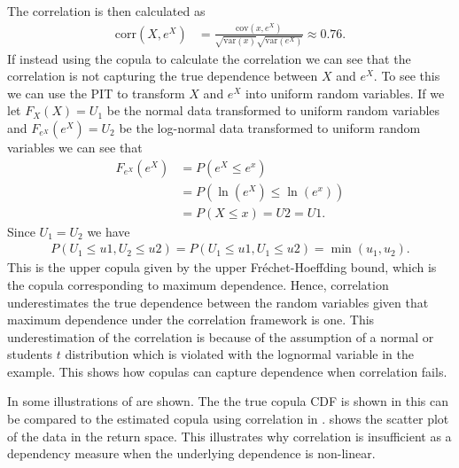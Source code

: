 \begin{example}
    The correlation is then calculated as
    \begin{align*}
        \mathrm{corr}(X,e^X) &= \frac{\mathrm{cov}(x,e^X)}{\sqrt{\mathrm{var}(x)} \sqrt{\mathrm{var}(e^X)}}  \approx 0.76. 
    \end{align*}
    If instead using the copula to calculate the correlation we can see that the correlation is not capturing the true dependence between $X$ and $e^X$. To see this we can use the \gls{PIT} to transform $X$ and $e^X$ into uniform random variables. If we let $F_X(X)=U_1$ be the normal data transformed to uniform random variables and $F_{e^X}(e^X)=U_2$ be the log-normal data transformed to uniform random variables we can see that 
    \begin{align*}
        F_{e^X}(e^X) &= P(e^X \leq e^x)\\
        &= P(\ln(e^X) \leq \ln (e^x))\\
        &=P(X\leq x) = U2 = U1.
    \end{align*}
    Since $U_1 = U_2$ we have 
    \begin{align*}
        P(U_1\leq u1, U_2\leq u2) = P(U_1\leq u1, U_1\leq u2) = \min(u_1,u_2).
    \end{align*}
    This is the upper copula given by the upper Fréchet-Hoeffding bound, which is the copula corresponding to maximum dependence. Hence, correlation underestimates the true dependence between the random variables given that maximum dependence under the correlation framework is one. This underestimation of the correlation is because of the assumption of a normal or students $t$ distribution which is violated with the lognormal variable in the example. This shows how copulas can capture dependence when correlation fails. 

    In  some illustrations of  are shown. The the true copula \gls{CDF} is shown in  this can be compared to the estimated copula using correlation in . %
     shows the scatter plot of the data in the return space. This illustrates why correlation is insufficient as a dependency measure when the underlying dependence is non-linear. 
    

\end{example}
